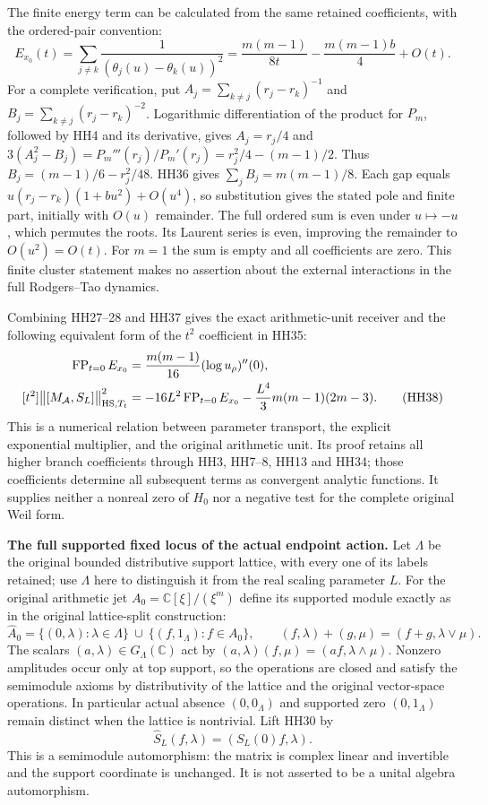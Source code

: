 The finite energy term can be calculated from the same retained
coefficients, with the ordered-pair convention:
\[
 E_{x_0}(t)=\sum_{j\ne k}
        \frac1{(\theta_j(u)-\theta_k(u))^2}
     =\frac{m(m-1)}{8t}-\frac{m(m-1)b}{4}+O(t).
 \tag{HH37}\label{hh:energy}
\]
For a complete verification, put
$A_j=\sum_{k\ne j}(r_j-r_k)^{-1}$ and
$B_j=\sum_{k\ne j}(r_j-r_k)^{-2}$.
Logarithmic differentiation of the product for $P_m$, followed by
HH4 and its derivative, gives
$A_j=r_j/4$ and
$3(A_j^2-B_j)=P_m'''(r_j)/P_m'(r_j)
=r_j^2/4-(m-1)/2$.
Thus $B_j=(m-1)/6-r_j^2/48$.
HH36 gives $\sum_jB_j=m(m-1)/8$.
Each gap equals $u(r_j-r_k)(1+bu^2)+O(u^4)$, so substitution gives
the stated pole and finite part, initially with $O(u)$ remainder.
The full ordered sum is even under $u\mapsto-u$, which permutes
the roots. Its Laurent series is even, improving the remainder
to $O(u^2)=O(t)$. For $m=1$ the sum is empty and all coefficients
are zero. This finite cluster statement makes no assertion about
the external interactions in the full Rodgers--Tao dynamics.

Combining HH27--28 and HH37 gives the exact arithmetic-unit receiver
and the following equivalent form of the $t^2$ coefficient in HH35:
\begin{align}
 \operatorname{FP}_{t=0}E_{x_0}
       &=\frac{m(m-1)}{16}(\log u_\rho)''(0),\notag\\
 [t^2]\bigl\|[M_{\mathcal A},S_L]\bigr\|_{\mathrm{HS},T_t}^2
       &=-16L^2\operatorname{FP}_{t=0}E_{x_0}
                    -\frac{L^4}{3}m(m-1)(2m-3).
 \tag{HH38}\label{hh:energy-receiver}
\end{align}
This is a numerical relation between parameter transport, the
explicit exponential multiplier, and the original arithmetic unit.
Its proof retains all higher branch coefficients through HH3,
HH7--8, HH13 and HH34; those coefficients determine all subsequent
terms as convergent analytic functions. It supplies neither a
nonreal zero of $H_0$ nor a negative test for the complete original
Weil form.

\HH\textbf{The full supported fixed locus of the actual endpoint action.}
Let $\Lambda$ be the original bounded distributive support lattice,
with every one of its labels retained; use $\Lambda$ here to
distinguish it from the real scaling parameter $L$.
For the original arithmetic jet $A_0=\mathbb C[\xi]/(\xi^m)$ define
its supported module exactly as in the original lattice-split
construction:
\[
 \widehat A_0=
   \{(0,\lambda):\lambda\in\Lambda\}
       \ \cup\ \{(f,1_\Lambda):f\in A_0\},\qquad
 (f,\lambda)+(g,\mu)=(f+g,\lambda\vee\mu).
 \tag{HH39}\label{hh:supported-module}
\]
The scalars $(a,\lambda)\in G_\Lambda(\mathbb C)$ act by
$(a,\lambda)(f,\mu)=(af,\lambda\wedge\mu)$.
Nonzero amplitudes occur only at top support, so the operations
are closed and satisfy the semimodule axioms by distributivity
of the lattice and the original vector-space operations.
In particular actual absence $(0,0_\Lambda)$ and supported zero
$(0,1_\Lambda)$ remain distinct when the lattice is nontrivial.
Lift HH30 by
\[
 \widehat S_L(f,\lambda)=(S_L(0)f,\lambda).
 \tag{HH40}
\]
This is a semimodule automorphism: the matrix is complex linear and
invertible and the support coordinate is unchanged.
It is not asserted to be a unital algebra automorphism.

